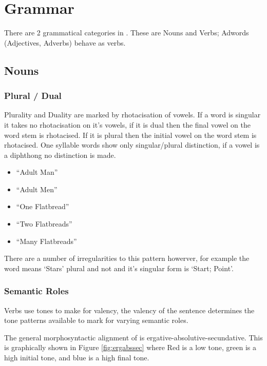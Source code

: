 \chapter{Grammar}

There are 2 grammatical categories in \langname{}. These are Nouns and Verbs; Adwords (Adjectives, Adverbs) behave as verbs.

\section{Nouns}

\subsection{Plural / Dual}

Plurality and Duality are marked by rhotacisation of vowels. If a word is singular it takes no rhotacisation on it's vowels, if it is dual then the final vowel on the word stem is rhotacised. If it is plural then the initial vowel on the word stem is rhotacised. One syllable words show only singular/plural distinction, if a vowel is a diphthong no distinction is made.

\begin{itemize}[label={}]
    \item {} \broad{\xC\xE} ``Adult Man''
    \item {} \broad{\xC\eR} ``Adult Men''
    \item {}  ``One Flatbread''
    \item {}  ``Two Flatbreads''
    \item {}  ``Many Flatbreads''
\end{itemize}

There are a number of irregularities to this pattern howerver, for example the word  means `Stars' plural and not  and it's singular form is  `Start; Point'.

\subsection{Semantic Roles}

Verbs use tones to make for valency, the valency of the sentence determines the tone patterns available to mark for varying semantic roles.

The general morphosyntactic alignment of \langname{} is ergative-absolutive-secundative. This is graphically shown in Figure \ref{fig:ergabssec} where Red is a low tone, green is a high initial tone, and blue is a high final tone.

